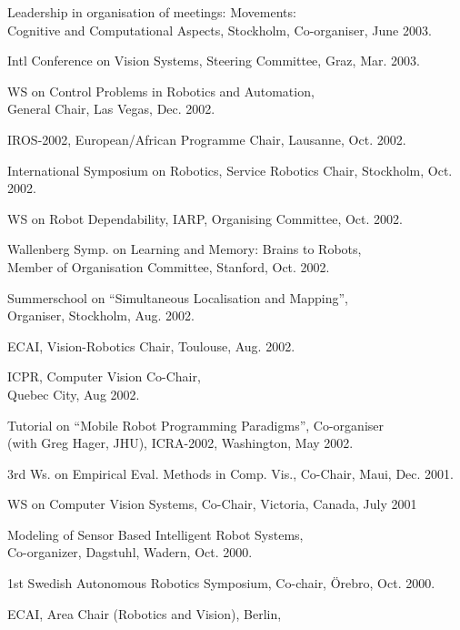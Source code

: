 \documentclass{article}
\begin{document}
\begin{cv}
\begin{cvlist}{Leadership in organisation of meetings:}
  Movements:\\ Cognitive and Computational Aspects, Stockholm,
  Co-organiser, \cftdotfill{\cftdotsep} June 2003.
\item Intl Conference on Vision Systems, Steering Committee, Graz,
  \cftdotfill{\cftdotsep} Mar. 2003.
\item WS on Control Problems in Robotics and Automation, \\General
  Chair, Las Vegas, \cftdotfill{\cftdotsep}Dec. 2002.
\item IROS-2002, European/African Programme Chair, Lausanne,
  \cftdotfill{\cftdotsep} Oct. 2002.
\item International Symposium on Robotics, Service Robotics Chair,
  Stockholm, \cftdotfill{\cftdotsep} Oct. 2002.
\item WS on Robot Dependability, IARP, Organising Committee,
  \cftdotfill{\cftdotsep} Oct. 2002.
\item Wallenberg Symp. on Learning and Memory: Brains to Robots,\\
  Member of Organisation Committee, Stanford, \cftdotfill{\cftdotsep} Oct. 2002.
\item Summerschool on ``Simultaneous Localisation and Mapping'',
  \\Organiser, Stockholm, \cftdotfill{\cftdotsep}Aug. 2002.
\item ECAI, Vision-Robotics Chair, Toulouse, \cftdotfill{\cftdotsep}
  Aug. 2002.
\item ICPR, Computer Vision Co-Chair,\\ Quebec City,
  \cftdotfill{\cftdotsep} Aug 2002.
\item Tutorial on ``Mobile Robot Programming Paradigms'',
  Co-organiser\\ (with Greg Hager, JHU), ICRA-2002, Washington,
  \cftdotfill{\cftdotsep}May 2002.
\item 3rd Ws. on Empirical Eval. Methods in Comp. Vis., Co-Chair,
  Maui, \cftdotfill{\cftdotsep} Dec. 2001.
\item WS on Computer Vision Systems, Co-Chair, Victoria,
  Canada,\cftdotfill{\cftdotsep} July 2001
\item Modeling of Sensor Based Intelligent Robot Systems,\\
  Co-organizer, Dagstuhl, Wadern, \cftdotfill{\cftdotsep} Oct. 2000.
\item 1st Swedish Autonomous Robotics Symposium, Co-chair, \"Orebro,
  \cftdotfill{\cftdotsep}Oct. 2000.
\item ECAI, Area Chair (Robotics and Vision), Berlin,

\end{cvlist}
\end{cv}
\end{document}
